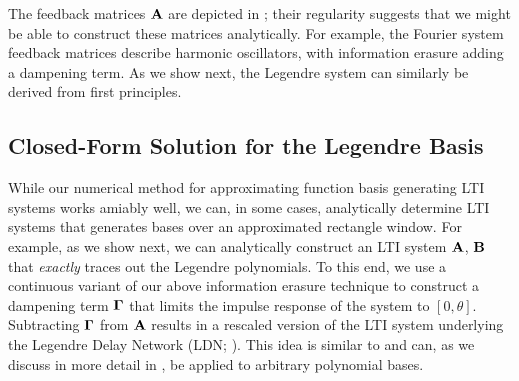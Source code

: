The feedback matrices $\mathbf{A}$ are depicted in ; their regularity suggests that we might be able to construct these matrices analytically.
For example, the Fourier system feedback matrices describe harmonic oscillators, with information erasure adding a dampening term.
As we show next, the Legendre system can similarly be derived from first principles.

\subsection{Closed-Form Solution for the Legendre Basis}
\label{sec:ldn_derivation}

While our numerical method for approximating function basis generating LTI systems works amiably well, we can, in some cases, analytically determine LTI systems that generates bases over an approximated rectangle window.
For example, as we show next, we can analytically construct an LTI system ${\mathbf{A}}$, ${\mathbf{B}}$ that \emph{exactly} traces out the Legendre polynomials.
To this end, we use a continuous variant of our above information erasure technique to construct a dampening term $\mathbf{\Gamma}$ that limits the impulse response of the system to $[0, \theta]$.
Subtracting $\mathbf{\Gamma}$ from $\mathbf{A}$ results in a rescaled version of the LTI system underlying the Legendre Delay Network (LDN; \cite{voelker2018improving}).
This idea is similar to \citet{gu2020hippo} and can, as we discuss in more detail in \citet{stockel2021constructing}, be applied to arbitrary polynomial bases.

